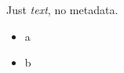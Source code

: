 \documentclass[
  12pt,
]{article}
\author{}
\date{}
\providecommand{\tightlist}{%
  \setlength{\itemsep}{0pt}\setlength{\parskip}{0pt}}
\begin{document}
Just \emph{text}, no metadata.

\begin{itemize}
\tightlist
\item
  a
\item
  b
\end{itemize}
\end{document}
